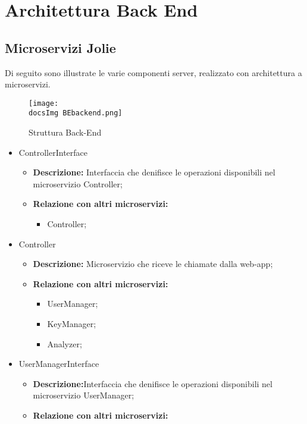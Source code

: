 \section{Architettura Back End}{

  \subsection{Microservizi Jolie}
Di seguito sono illustrate le varie componenti server, realizzato con architettura a microservizi.

	\begin{figure}[H]
		\centering
		\texttt{[image: \\docsImg BEbackend.png]}
		\caption{Struttura Back-End}
		\label{Struttura Back-End}
	\end{figure}

\begin{itemize}
\item ControllerInterface
  \begin{itemize}
  \item \textbf{Descrizione:} Interfaccia che denifisce le operazioni disponibili nel microservizio Controller;
    \item \textbf{Relazione con altri microservizi:}
      \begin{itemize}
      \item Controller;
      \end{itemize}
  \end{itemize}
\item Controller
  \begin{itemize}
  \item \textbf{Descrizione:} Microservizio che riceve le chiamate dalla web-app;
    \item \textbf{Relazione con altri microservizi:}
      \begin{itemize}
      \item UserManager;
        \item KeyManager;
        \item Analyzer;
      \end{itemize}
  \end{itemize}
\item UserManagerInterface
  \begin{itemize}
  \item \textbf{Descrizione:}Interfaccia che denifisce le operazioni disponibili nel microservizio UserManager;
    \item \textbf{Relazione con altri microservizi:}
      \begin{itemize}

\end{itemize}
\end{itemize}
\end{itemize}}
